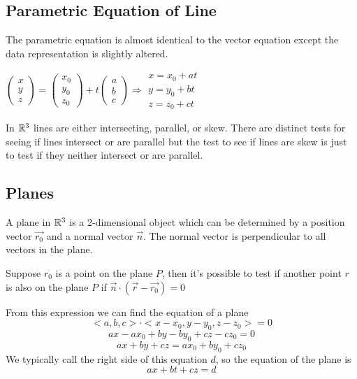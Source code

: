 \documentclass[12 pt]{article}
\begin{document}
		\subsection{Parametric Equation of Line}
		The parametric equation is almost identical to the vector equation except the data representation is slightly altered.\\
		\begin{center}
			$\begin{pmatrix}x \\ y \\ z\end{pmatrix}=\begin{pmatrix}x_0 \\ y_0 \\ z_0\end{pmatrix}+t\begin{pmatrix}a \\ b \\ c\end{pmatrix} \Rightarrow \begin{matrix} x=x_0+at \\ y=y_0+bt \\ z=z_0+ct\end{matrix}$
		\end{center}

		In $\mathbb{R}^3$ lines are either intersecting, parallel, or skew. There are distinct tests for seeing if lines intersect or are parallel but the test to see if lines are skew is just to test if they neither intersect or are parallel.

		\subsection{Planes}

		A plane in $\mathbb{R}^3$ is a 2-dimensional object which can be determined by a position vector $\vec{r_0}$ and a normal vector $\vec{n}$. The normal vector is perpendicular to all vectors in the plane.

		Suppose $r_0$ is a point on the plane $P$, then it's possible to test if another point $r$ is also on the plane $P$ if $\vec{n}\cdot (\vec{r}-\vec{r_0})=0$

		From this expression we can find the equation of a plane
		$$<a,b,c>\cdot<x-x_0,y-y_0,z-z_0>=0$$
		$$ax-ax_0+by-by_0+cz-cz_0=0$$
		$$ax+by+cz=ax_0+by_0+cz_0$$
		We typically call the right side of this equation $d$, so the equation of the plane is
		$$ax+bt+cz=d$$
\end{document}
